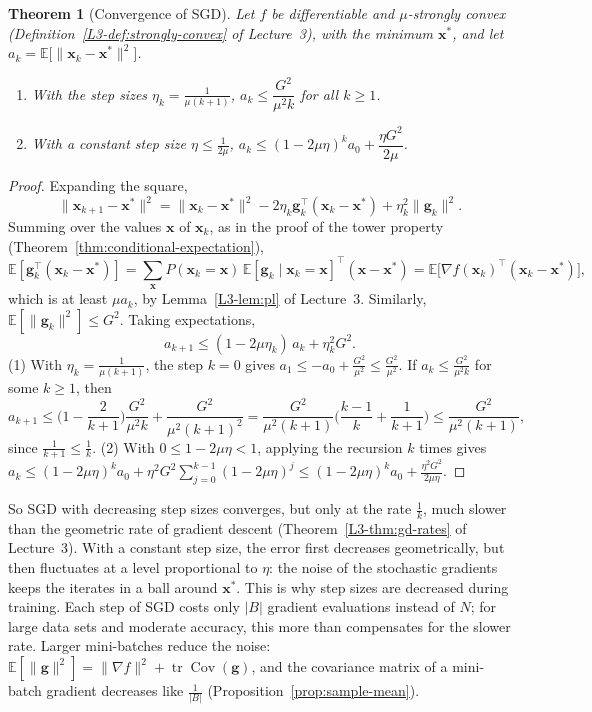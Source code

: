 \documentclass[11pt]{article}
\newcommand{\norm}[1]{\lVert #1 \rVert}
\newcommand{\E}{\mathbb{E}}
\DeclareMathOperator{\Cov}{Cov}
\theoremstyle{definition}
\theoremstyle{plain}
\newtheorem{theorem}[definition]{Theorem}
\theoremstyle{remark}
\DeclareMathOperator{\tr}{tr}
\begin{document}
\begin{theorem}[Convergence of SGD]\label{thm:sgd}
    Let $f$ be differentiable and $\mu$-strongly convex (Definition~\ref{L3-def:strongly-convex} of Lecture~3), with the minimum $\mathbf{x}^*$, and let $a_k = \E\big[\norm{\mathbf{x}_k - \mathbf{x}^*}^2\big]$.
    \begin{enumerate}
        \item With the step sizes $\eta_k = \frac{1}{\mu(k + 1)}$, $a_k \leq \dfrac{G^2}{\mu^2k}$ for all $k \geq 1$.
        \item With a constant step size $\eta \leq \frac{1}{2\mu}$, $a_k \leq (1 - 2\mu\eta)^ka_0 + \dfrac{\eta G^2}{2\mu}$.
    \end{enumerate}
\end{theorem}

\begin{proof}
    Expanding the square,
    \[\norm{\mathbf{x}_{k+1} - \mathbf{x}^*}^2 = \norm{\mathbf{x}_k - \mathbf{x}^*}^2 - 2\eta_k\mathbf{g}_k^\top(\mathbf{x}_k - \mathbf{x}^*) + \eta_k^2\norm{\mathbf{g}_k}^2.\]
    Summing over the values $\mathbf{x}$ of $\mathbf{x}_k$, as in the proof of the tower property (Theorem~\ref{thm:conditional-expectation}),
    \[\E[\mathbf{g}_k^\top(\mathbf{x}_k - \mathbf{x}^*)] = \sum_{\mathbf{x}} P(\mathbf{x}_k = \mathbf{x})\,\E[\mathbf{g}_k \mid \mathbf{x}_k = \mathbf{x}]^\top(\mathbf{x} - \mathbf{x}^*) = \E\big[\nabla f(\mathbf{x}_k)^\top(\mathbf{x}_k - \mathbf{x}^*)\big],\]
    which is at least $\mu a_k$, by Lemma~\ref{L3-lem:pl} of Lecture~3. Similarly, $\E[\norm{\mathbf{g}_k}^2] \leq G^2$. Taking expectations,
    \[a_{k+1} \leq (1 - 2\mu\eta_k)\,a_k + \eta_k^2G^2.\]
    (1) With $\eta_k = \frac{1}{\mu(k + 1)}$, the step $k = 0$ gives $a_1 \leq -a_0 + \frac{G^2}{\mu^2} \leq \frac{G^2}{\mu^2}$. If $a_k \leq \frac{G^2}{\mu^2k}$ for some $k \geq 1$, then
    \[a_{k+1} \leq \Big(1 - \frac{2}{k + 1}\Big)\frac{G^2}{\mu^2k} + \frac{G^2}{\mu^2(k + 1)^2} = \frac{G^2}{\mu^2(k + 1)}\Big(\frac{k - 1}{k} + \frac{1}{k + 1}\Big) \leq \frac{G^2}{\mu^2(k + 1)},\]
    since $\frac{1}{k + 1} \leq \frac{1}{k}$. (2) With $0 \leq 1 - 2\mu\eta < 1$, applying the recursion $k$ times gives $a_k \leq (1 - 2\mu\eta)^ka_0 + \eta^2G^2\sum_{j=0}^{k-1}(1 - 2\mu\eta)^j \leq (1 - 2\mu\eta)^ka_0 + \frac{\eta^2G^2}{2\mu\eta}$.
\end{proof}

So SGD with decreasing step sizes converges, but only at the rate $\frac{1}{k}$, much slower than the geometric rate of gradient descent (Theorem~\ref{L3-thm:gd-rates} of Lecture~3). With a constant step size, the error first decreases geometrically, but then fluctuates at a level proportional to $\eta$: the noise of the stochastic gradients keeps the iterates in a ball around $\mathbf{x}^*$. This is why step sizes are decreased during training. Each step of SGD costs only $|B|$ gradient evaluations instead of $N$; for large data sets and moderate accuracy, this more than compensates for the slower rate. Larger mini-batches reduce the noise: $\E[\norm{\mathbf{g}}^2] = \norm{\nabla f}^2 + \tr\Cov(\mathbf{g})$, and the covariance matrix of a mini-batch gradient decreases like $\frac{1}{|B|}$ (Proposition~\ref{prop:sample-mean}).
\end{document}
